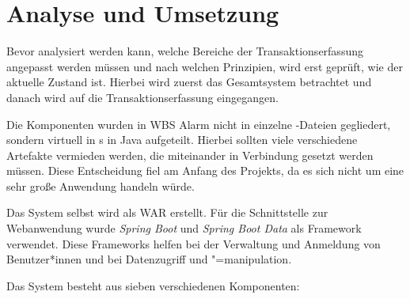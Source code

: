 \chapter{Analyse und Umsetzung}
\label{ch:Vorgehensweise}

Bevor analysiert werden kann, welche Bereiche der Transaktionserfassung angepasst werden müssen und nach welchen Prinzipien, wird erst geprüft, wie der aktuelle Zustand ist. Hierbei wird zuerst das Gesamtsystem betrachtet und danach wird auf die Transaktionserfassung eingegangen. 

Die Komponenten wurden in WBS Alarm nicht in einzelne -Dateien gegliedert, sondern virtuell in s in Java aufgeteilt. Hierbei sollten viele verschiedene Artefakte vermieden werden, die miteinander in Verbindung gesetzt werden müssen. Diese Entscheidung fiel am Anfang des Projekts, da es sich nicht um eine sehr große Anwendung handeln würde. 

Das System selbst wird als \ac{WAR} erstellt. Für die Schnittstelle zur Webanwendung wurde \textit{Spring Boot} und \textit{Spring Boot Data} als Framework verwendet. Diese Frameworks helfen bei der Verwaltung und Anmeldung von Benutzer*innen und bei Datenzugriff und "=manipulation.

Das System besteht aus sieben verschiedenen Komponenten:

